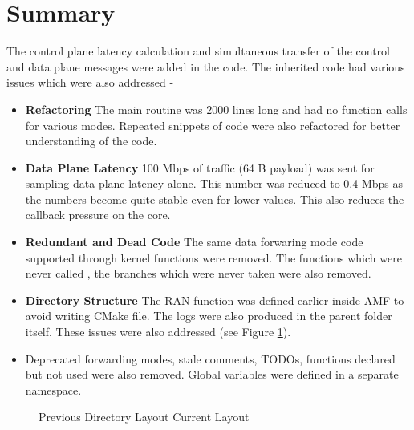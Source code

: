 \section{Summary}
The control plane latency calculation and simultaneous transfer of the control and data plane messages 
were added in the code. The inherited code had various issues which were also addressed -
\begin{itemize}
\item \textbf{Refactoring} The main routine was 2000 lines long and had no function calls for various modes. Repeated snippets of code were also refactored for 
better understanding of the code.
\item \textbf{Data Plane Latency} 100 Mbps of traffic (64 B payload) was sent for sampling data plane latency alone. This number was reduced to 0.4 Mbps as the numbers become quite stable even for lower values. 
This also reduces the callback pressure on the core.
\item \textbf{Redundant  and Dead Code} The same data forwaring mode code  supported through kernel
 functions were removed. The functions which were never called , the branches which were never taken were also removed. 
\item \textbf{Directory Structure} The RAN function was defined earlier inside AMF to avoid writing CMake file. 
The logs were also produced in the parent folder itself. These issues were also addressed (see Figure \ref{figure:RANDir}).
\item Deprecated forwarding modes,  stale comments, TODOs, functions declared but not used were also removed. Global variables were defined
in a separate namespace.  
\end{itemize} 
\begin{figure}[htbp]
	\centering

	\caption{ Previous Directory Layout   Current Layout}
	\label{figure:RANDir}
\end{figure}
